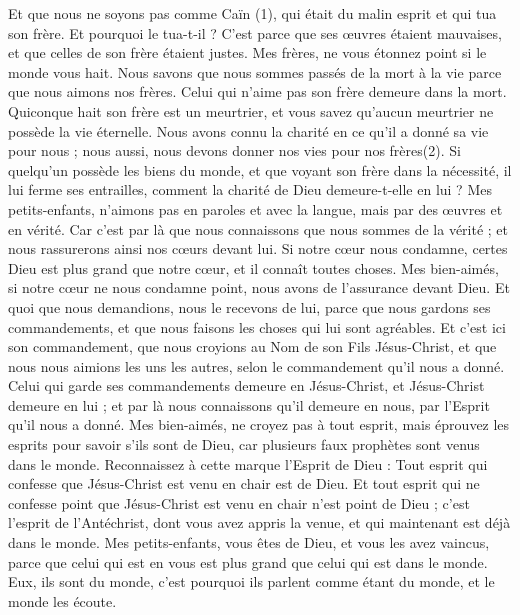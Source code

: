 \begin{multicols}{2}
Et que nous ne soyons pas comme Caïn (1), qui était du malin esprit et qui tua son frère. Et pourquoi le tua-t-il ? C’est parce que ses œuvres étaient mauvaises, et que celles de son frère étaient justes.
Mes frères, ne vous étonnez point si le monde vous hait.
Nous savons que nous sommes passés de la mort à la vie parce que nous aimons nos frères. Celui qui n'aime pas son frère demeure dans la mort.
Quiconque hait son frère est un meurtrier, et vous savez qu'aucun meurtrier ne possède la vie éternelle.
Nous avons connu la charité en ce qu'il a donné sa vie pour nous ; nous aussi, nous devons donner nos vies pour nos frères(2).
Si quelqu’un possède les biens du monde, et que voyant son frère dans la nécessité, il lui ferme ses entrailles, comment la charité de Dieu demeure-t-elle en lui ?
Mes petits-enfants, n'aimons pas en paroles et avec la langue, mais par des œuvres et en vérité.
Car c'est par là que nous connaissons que nous sommes de la vérité ; et nous rassurerons ainsi nos cœurs devant lui.
Si notre cœur nous condamne, certes Dieu est plus grand que notre cœur, et il connaît toutes choses.
Mes bien-aimés, si notre cœur ne nous condamne point, nous avons de l’assurance devant Dieu.
Et quoi que nous demandions, nous le recevons de lui, parce que nous gardons ses commandements, et que nous faisons les choses qui lui sont agréables.
Et c'est ici son commandement, que nous croyions au Nom de son Fils Jésus-Christ, et que nous nous aimions les uns les autres, selon le commandement qu’il nous a donné.
Celui qui garde ses commandements demeure en Jésus-Christ, et Jésus-Christ demeure en lui ; et par là nous connaissons qu'il demeure en nous, par l'Esprit qu'il nous a donné.
\VerseOne{}Mes bien-aimés, ne croyez pas à tout esprit, mais éprouvez les esprits pour savoir s'ils sont de Dieu, car plusieurs faux prophètes sont venus dans le monde.
Reconnaissez à cette marque l'Esprit de Dieu : Tout esprit qui confesse que Jésus-Christ est venu en chair est de Dieu.
Et tout esprit qui ne confesse point que Jésus-Christ est venu en chair n'est point de Dieu ; c’est l'esprit de l'Antéchrist, dont vous avez appris la venue, et qui maintenant est déjà dans le monde.
Mes petits-enfants, vous êtes de Dieu, et vous les avez vaincus, parce que celui qui est en vous est plus grand que celui qui est dans le monde.
Eux, ils sont du monde, c'est pourquoi ils parlent comme étant du monde, et le monde les écoute.

\end{multicols}
